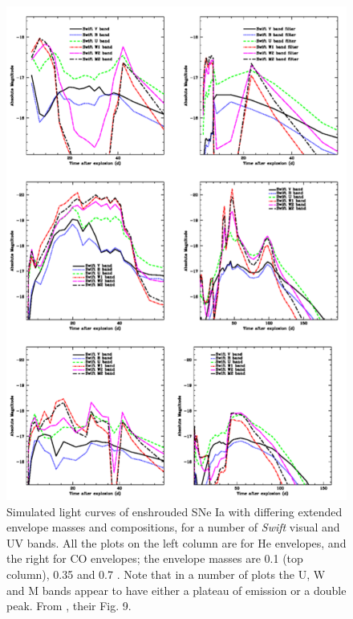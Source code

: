 \begin{figure}
\centerline{\includegraphics[width=0.8\hsize]{fryerfig.pdf}}
\caption{Simulated light curves of enshrouded SNe Ia with differing extended envelope masses and compositions, for a number of \textit{Swift} visual and UV bands.  All the plots on the left column are for He envelopes, and the right for CO envelopes; the envelope masses are 0.1 (top column), 0.35 and 0.7 {\Msun}.  Note that in a number of plots the U, W and M bands appear to have either a plateau of emission or a double peak.  From \cite{frye+10}, their Fig. 9.}
\label{fryerfig}
\end{figure}


